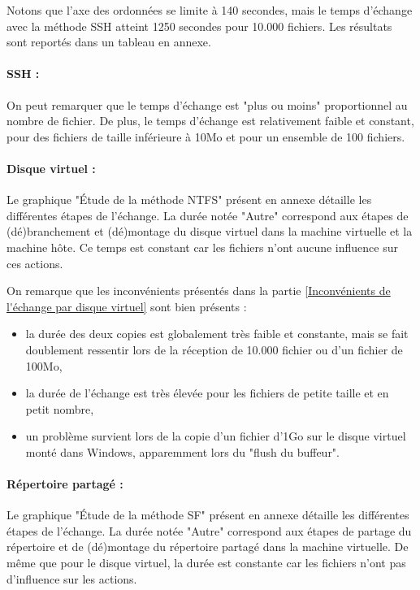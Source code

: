 Notons que l'axe des ordonnées se limite à 140 secondes, mais le temps d'échange avec la méthode SSH atteint 1250 secondes pour 10.000 fichiers.
Les résultats sont reportés dans un tableau en annexe.
\\


\paragraph{SSH :}
On peut remarquer que le temps d'échange est "plus ou moins" proportionnel au nombre de fichier.
De plus, le temps d'échange est relativement faible et constant, pour des fichiers de taille inférieure à 10Mo et pour un ensemble de 100 fichiers.


\paragraph{Disque virtuel :}
Le graphique "Étude de la méthode NTFS" présent en annexe détaille les différentes étapes de l'échange.
La durée notée "Autre" correspond aux étapes de (dé)branchement et (dé)montage du disque virtuel dans la machine virtuelle et la machine hôte.
Ce temps est constant car les fichiers n'ont aucune influence sur ces actions.

On remarque que les inconvénients présentés dans la partie \ref{Inconvénients de l'échange par disque virtuel} sont bien présents :
\begin{itemize}
	\item la durée des deux copies est globalement très faible et constante, mais se fait doublement ressentir lors de la réception de 10.000 fichier ou d'un fichier de 100Mo,
	\item la durée de l'échange est très élevée pour les fichiers de petite taille et en petit nombre,
	\item un problème survient lors de la copie d'un fichier d'1Go sur le disque virtuel monté dans Windows, apparemment lors du "flush du buffeur".
\end{itemize}


\paragraph{Répertoire partagé :}
Le graphique "Étude de la méthode SF" présent en annexe détaille les différentes étapes de l'échange.
La durée notée "Autre" correspond aux étapes de partage du répertoire et de (dé)montage du répertoire partagé dans la machine virtuelle.
De même que pour le disque virtuel, la durée est constante car les fichiers n'ont pas d'influence sur les actions.

